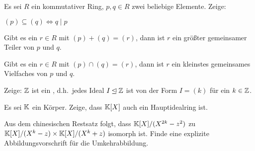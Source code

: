 \begin{sheet}
\begin{problem}[title={Ideale vs. Teilbarkeit}]
        Es sei $R$ ein kommutativer Ring, $p,q\in R$ zwei beliebige Elemente. Zeige:
        \begin{subproblem}
            $(p) \subseteq (q) \iff q \mid p$
        \end{subproblem}

        \begin{subproblem}
            Gibt es ein $r\in R$ mit $(p) + (q) = (r)$, dann ist $r$ ein größter gemeinsamer Teiler von $p$ und $q$.
        \end{subproblem}
        \begin{subproblem}
            Gibt es ein $r\in R$ mit $(p) \cap (q) = (r)$, dann ist $r$ ein kleinstes gemeinsames Vielfaches von $p$ und $q$.
        \end{subproblem}
    \end{problem}

    \begin{problem}
        Zeige: $\mathbb{Z}$ ist ein , d.h.\ jedes Ideal $I\unlhd\mathbb{Z}$ ist von der Form $I=(k)$ für ein $k\in\mathbb{Z}$.
    \end{problem}
    \begin{problem}
        Es sei $\mathbb{K}$ ein Körper. Zeige, dass $\mathbb{K}[X]$ auch ein Hauptidealring ist.
    \end{problem}

    \begin{problem}
        Aus dem chinesischen Restsatz folgt, dass $\mathbb{K}[X]/(X^{2k}-z^2)$ zu $\mathbb{K}[X]/(X^k-z) \times \mathbb{K}[X]/(X^k+z)$ isomorph ist. Finde eine explizite Abbildungsvorschrift für die Umkehrabbildung.
    \end{problem}
\end{sheet}